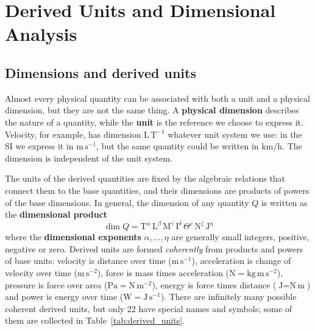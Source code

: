 \documentclass[letterpaper,11pt,leqno]{book}
\begin{document}
\section{Derived Units and Dimensional Analysis}
\label{sec:derived_units}

\subsection{Dimensions and derived units}

Almost every physical quantity can be associated with both a unit and a physical dimension, but they are not the same thing. A \textbf{physical dimension} describes the nature of a quantity, while the \textbf{unit} is the reference we choose to express it. Velocity, for example, has dimension $\text{L}\,\text{T}^{-1}$ whatever unit system we use: in the SI we express it in $\text{m}\,\text{s}^{-1}$, but the same quantity could be written in $\text{km/h}$. The dimension is independent of the unit system.

The units of the derived quantities are fixed by the algebraic relations that connect them to the base quantities, and their dimensions are products of powers of the base dimensions. In general, the dimension of any quantity $Q$ is written as the \textbf{dimensional product}
\begin{equation}
\boxed{\dim Q = \text{T}^{\alpha}\,\text{L}^{\beta}\,\text{M}^{\gamma}\,\text{I}^{\delta}\,\Theta^{\varepsilon}\,\text{N}^{\zeta}\,\text{J}^{\eta}}
\label{eq:dimensional_product}
\end{equation}
where the \textbf{dimensional exponents} $\alpha, \dots, \eta$ are generally small integers, positive, negative or zero. Derived units are formed \emph{coherently} from products and powers of base units: velocity is distance over time ($\text{m}\,\text{s}^{-1}$), acceleration is change of velocity over time ($\text{m}\,\text{s}^{-2}$), force is mass times acceleration ($\text{N} = \text{kg}\,\text{m}\,\text{s}^{-2}$), pressure is force over area ($\text{Pa} = \text{N}\,\text{m}^{-2}$), energy is force times distance ($\text{J} = \text{N}\,\text{m}$) and power is energy over time ($\text{W} = \text{J}\,\text{s}^{-1}$). There are infinitely many possible coherent derived units, but only 22 have special names and symbols; some of them are collected in Table~\ref{tab:derived_units}.
\end{document}
